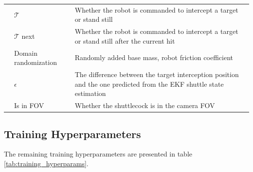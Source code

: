 \documentclass[9pt,twocolumn,twoside]{osajnl}
\begin{document}
\begin{table}
\begin{tabular}{p{1.8cm}p{3cm}p{12cm}}
    \multicolumn{1}{l|}{}                              & \cellcolor{grey}$\mathcal{T}$          & Whether the robot is commanded to intercept a target or stand still                                                 \\
    \multicolumn{1}{l|}{}                              & \cellcolor{grey}$\mathcal{T}$ next     & Whether the robot is commanded to intercept a target or stand still after the current hit                           \\
    \multicolumn{1}{l|}{}                              & Domain randomization     & Randomly added base mass, robot friction coefficient                                                                \\
    \multicolumn{1}{l|}{}                              & $\epsilon$         & The difference between the target interception position and the one predicted from the \ac{EKF} shuttle state estimation \\
    \multicolumn{1}{l|}{}                              & Is in FOV                & Whether the shuttlecock is in the camera FOV                                                                       
    \end{tabular}
    \end{table}

\subsection*{Training Hyperparameters}

The remaining training hyperparameters are presented in table \ref{tab:training_hyperparams}.

\end{document}

